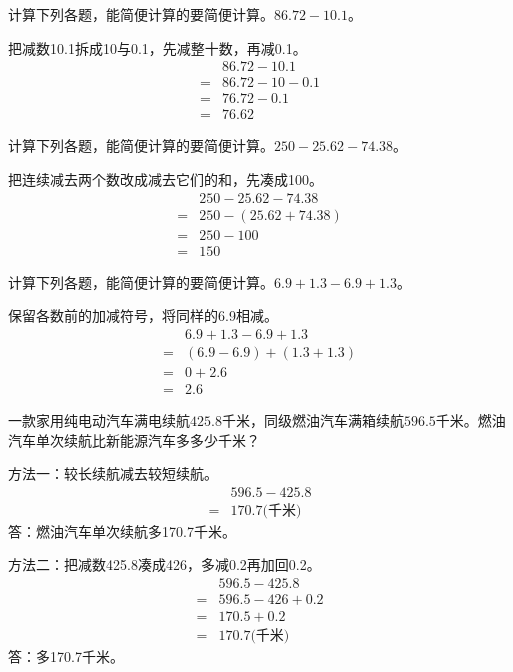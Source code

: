 计算下列各题，能简便计算的要简便计算。\(86.72-10.1\)。\par
\begin{BookAnswer}
把减数10.1拆成10与0.1，先减整十数，再减0.1。\[\begin{aligned}&86.72-10.1\\={}&86.72-10-0.1\\={}&76.72-0.1\\={}&76.62\end{aligned}\]
\end{BookAnswer}

计算下列各题，能简便计算的要简便计算。\(250-25.62-74.38\)。\par
\begin{BookAnswer}
把连续减去两个数改成减去它们的和，先凑成100。\[\begin{aligned}&250-25.62-74.38\\={}&250-(25.62+74.38)\\={}&250-100\\={}&150\end{aligned}\]
\end{BookAnswer}

计算下列各题，能简便计算的要简便计算。\(6.9+1.3-6.9+1.3\)。\par
\begin{BookAnswer}
保留各数前的加减符号，将同样的6.9相减。\[\begin{aligned}&6.9+1.3-6.9+1.3\\={}&(6.9-6.9)+(1.3+1.3)\\={}&0+2.6\\={}&2.6\end{aligned}\]
\end{BookAnswer}

一款家用纯电动汽车满电续航\(425.8\)千米，同级燃油汽车满箱续航\(596.5\)千米。燃油汽车单次续航比新能源汽车多多少千米？\par
\begin{BookAnswer}
方法一：较长续航减去较短续航。\[\begin{aligned}&596.5-425.8\\={}&170.7\text{(千米)}\end{aligned}\]答：燃油汽车单次续航多170.7千米。\par 方法二：把减数425.8凑成426，多减0.2再加回0.2。\[\begin{aligned}&596.5-425.8\\={}&596.5-426+0.2\\={}&170.5+0.2\\={}&170.7\text{(千米)}\end{aligned}\]答：多170.7千米。
\end{BookAnswer}

